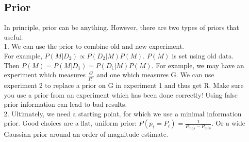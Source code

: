\documentclass[12pt]{article}
\begin{document}
\subsection{Prior}
In principle, prior can be anything. However, there are two types of priors that useful.\\
1. We can use the prior to combine old and new experiment.\\
For example, $P(M|D_2) \propto P(D_2|M)P(M)$. $P(M)$ is set using old data. Then $P(M) = P(M|D_1) = P(D_1|M)P(M)$.
For example, we may have an experiment which measures $\frac{G}{R^2}$ and one which measures G. We can use experiment 2 to replace a prior on G in experiment 1 and thus get R. Make sure you use a prior from an experiment which has been done correctly! Using false prior information can lead to bad results.\\
2. Ultimately, we need a starting point, for which we use a minimal information prior. Good choices are a flat, uniform prior: $P(p_i = P_i) = \frac{1}{P_{max} - P_{min}}$. Or a wide Gaussian prior around an order of magnitude estimate.
\end{document}
